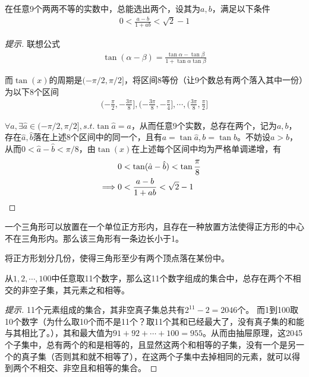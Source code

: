 \begin{example}
  在任意9个两两不等的实数中，总能选出两个，设其为$a,b$，满足以下条件
  \begin{align*}
    0 < \frac{a-b}{1+ab} < \sqrt2 -1
  \end{align*}
\end{example}

\begin{proof}[提示]
  联想公式
  \begin{align*}
    \tan(\alpha-\beta)=\frac{\tan\alpha-\tan\beta}{1+\tan\alpha\tan\beta}
  \end{align*}

  而$\tan(x)$的周期是$(-\pi/2, \pi/2]$，将区间8等份（让9个数总有两个落入其中一份）为以下8个区间
  \begin{align*}
    (-\frac\pi2, -\frac{3\pi}8], (-\frac{3\pi}8, -\frac\pi4], \cdots, (\frac{3\pi}8, \frac\pi2]
  \end{align*}

  $\forall a, \exists\hat a\in(-\pi/2, \pi/2], s.t. \tan\hat a = a$，从而任意9个实数，总存在两个，记为$a,b$，存在$\hat a, \hat b$落在上述8个区间中的同一个，且有$a=\tan\hat a, b=\tan\hat b$。不妨设$a>b$，从而$0<\hat a-\hat b<\pi/8$，由$\tan(x)$在上述每个区间中均为严格单调递增，有
  \begin{align*}
             & 0 < \tan(\hat a - \hat b) < \tan\frac\pi8\\
    \implies & 0 < \frac{a - b}{1+ab} < \sqrt2 - 1&\qedhere
  \end{align*}
\end{proof}


\begin{question}
  一个三角形可以放置在一个单位正方形内，且存在一种放置方法使得正方形的中心不在三角形内。那么该三角形有一条边长小于1。
\end{question}

\hints 将正方形划分几份，使得三角形至少有两个顶点落在某份中。

\begin{question}
  从$1,2,\cdots,100$中任意取11个数字，那么这11个数字组成的集合中，总存在两个不相交的非空子集，其元素之和相等。
\end{question}
\begin{proof}[提示]
11个元素组成的集合，其非空真子集总共有$2^{11}-2=2046$个。
而1到100取10个数字（\think 为什么取10个而不是11个？取11个其和已经最大了，没有真子集的和能与其相比了。），其和最大值为$91+92+\cdots+100=955$。从而由抽屉原理，这2045个子集中，总有两个的和是相等的，且显然这两个和相等的子集，没有一个是另一个的真子集（否则其和就不相等了），在这两个子集中去掉相同的元素，就可以得到两个不相交、非空且和相等的集合。
\end{proof}

